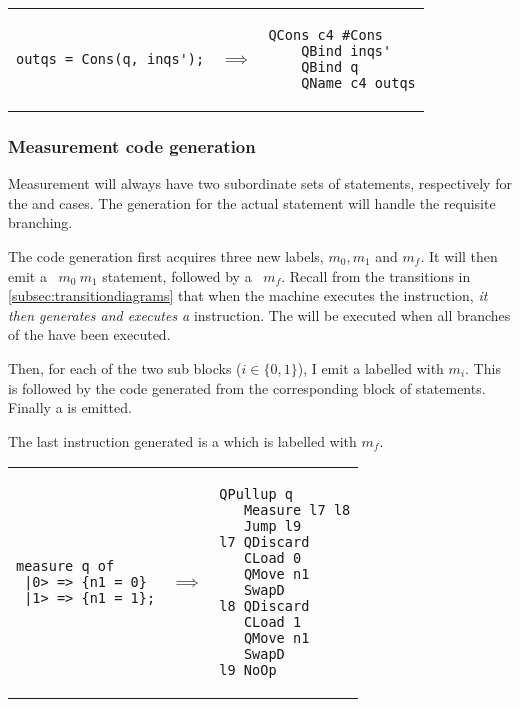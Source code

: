 \begin{center}
\begin{tabular}{p{2in}p{.3in}p{1.5in}}
{\begin{singlespace}
\begin{lstlisting}[style=linqpl]
outqs = Cons(q, inqs');
\end{lstlisting}
\end{singlespace}}
 & { \qquad \qquad \quad \quad \qquad \qquad $\implies$} &
{\begin{singlespace}
\begin{lstlisting}[style=linqpl]
    QCons c4 #Cons
    QBind inqs'
    QBind q
    QName c4 outqs
\end{lstlisting}
\end{singlespace}}
\end{tabular}
\end{center}


\subsubsection{Measurement code generation}
Measurement will always have two subordinate sets of statements,
respectively for the  and  cases. 
The generation for the actual statement will handle the requisite branching.

The code generation first acquires three new labels, $m_0,m_1$ and $m_f$. It
will then emit a ~$m_0\ m_1$ statement, followed by 
a ~$m_f$. Recall from the transitions 
in \vref{subsec:transitiondiagrams} that when the machine executes
the  instruction, \emph{it then generates and executes a}
 instruction. The  will be executed when 
all branches of the \qubit{} have been executed.

Then, for each of the two sub blocks ($i\in\{0,1\}$), 
I emit a  labelled with $m_i$. This is followed by the 
code generated from the corresponding block of statements. Finally a 
 is emitted.

The last instruction generated is a  which is labelled
with $m_f$.


\begin{center}
\begin{tabular}{p{2in}p{.3in}p{1.5in}}
{\begin{singlespace}
\begin{lstlisting}[style=linqpl]
measure q of 
 |0> => {n1 = 0}
 |1> => {n1 = 1};
\end{lstlisting}
\end{singlespace}}
 & { \qquad \qquad \quad \quad \qquad \qquad $\implies$} &
{\begin{singlespace}
\begin{lstlisting}[style=linqpl]
   QPullup q
   Measure l7 l8
   Jump l9
l7 QDiscard
   CLoad 0
   QMove n1
   SwapD
l8 QDiscard
   CLoad 1
   QMove n1
   SwapD 
l9 NoOp
\end{lstlisting}
\end{singlespace}}
\end{tabular}
\end{center}


